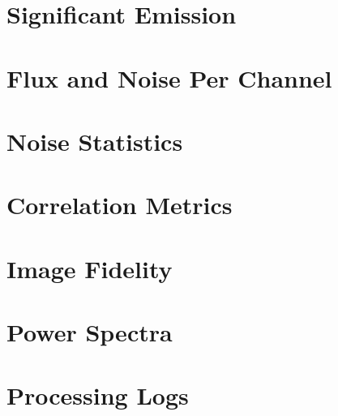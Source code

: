 \documentclass[11pt]{report}
\begin{document}
\section{Significant Emission}
\label{sect:emission_masks}
%

\section{Flux and Noise Per Channel}
\label{sect:perchannel}
%




%

\section{Noise Statistics}
\label{sec:noise_stats}







\section{Correlation Metrics}
\label{sec:correlation_stats}










\section{Image Fidelity}
\label{sec:fidelity}
%
%

\section{Power Spectra}
\label{sec:powerspec}
%
%

\section{Processing Logs}
\label{sec:logs}
%
\end{document}
